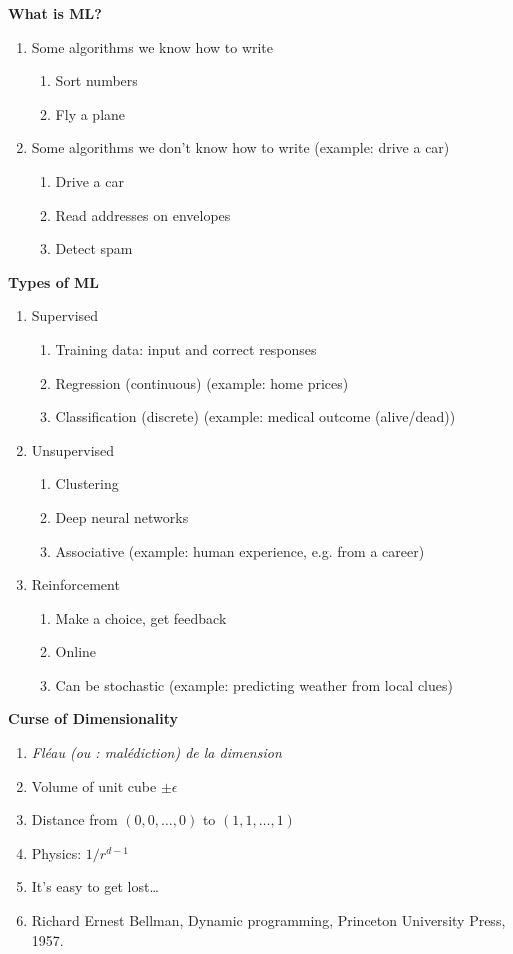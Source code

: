 




\textbf{What is ML?}
\begin{enumerate}
\item Some algorithms we know how to write
  \begin{enumerate}
  \item Sort numbers
  \item Fly a plane
  \end{enumerate}
\item Some algorithms we don't know how to write (example: drive a car)
  \begin{enumerate}
  \item Drive a car 
  \item Read addresses on envelopes
  \item Detect spam
  \end{enumerate}
\end{enumerate}

\textbf{Types of ML}
\begin{enumerate}
\item Supervised
  \begin{enumerate}
  \item Training data: input and correct responses
  \item Regression (continuous) (example: home prices)
  \item Classification (discrete) (example: medical outcome (alive/dead))
  \end{enumerate}
\item Unsupervised
  \begin{enumerate}
  \item Clustering
  \item Deep neural networks
  \item Associative (example: human experience, e.g. from a career)
  \end{enumerate}
\item Reinforcement
  \begin{enumerate}
  \item Make a choice, get feedback
  \item Online
  \item Can be stochastic (example: predicting weather from local clues)
  \end{enumerate}
\end{enumerate}

\textbf{Curse of Dimensionality}
\begin{enumerate}
\item \textit{Fléau (ou : malédiction) de la dimension}
\item Volume of unit cube $\pm\epsilon$
\item Distance from $(0,0,\ldots,0)$ to $(1,1,\ldots,1)$
\item Physics: $1/r^{d-1}$
\item It's easy to get lost\dots
\item Richard Ernest Bellman, Dynamic programming, Princeton
  University Press, 1957.
\end{enumerate}


